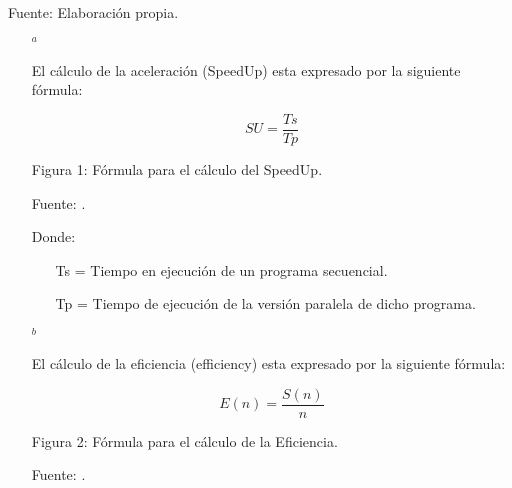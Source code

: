 \begin{table}[h!]
\begin{tabular}{|p{3cm}|p{3cm}|p{3cm}|p{4cm}|}
                \end{tabular}
                \begin{center}
                    \vskip -0.2cm
                    {\small{Fuente: Elaboración propia.}}
                \end{center}
                \footnotesize{
                    \begin{enumerate}
                        \item[$^a$]{El cálculo de la aceleración (SpeedUp) esta expresado por la siguiente fórmula:\par
                            \begin{equation*}\label{}
                                SU = \frac{Ts}{Tp}                    
                            \end{equation*}  
                            \begin{center}
                                { Figura 1: Fórmula para el cálculo del SpeedUp.}\par
                                { Fuente: {\cite{rafael2009}}. }\par                   
                            \end{center} 
                            Donde:
                            \vskip 0.3cm
                            \begin{enumerate}
                                \item[]{Ts = Tiempo en ejecución de un programa secuencial.}
                                \item[]{Tp = Tiempo de ejecución de la versión paralela de dicho programa.}
                            \end{enumerate}\par   
                        }
                        \item[$^b$]{El cálculo de la eficiencia (efficiency) esta expresado por la siguiente fórmula:\par
                            \begin{equation*}\label{}
                                E(n) = \frac{S(n)}{n}                   
                            \end{equation*}                
                            \begin{center}
                                { Figura 2: Fórmula para el cálculo de la Eficiencia.}\par
                                { Fuente: {\cite{rafael2009}}. }                       

\end{center}}
\end{enumerate}}
\end{table}
